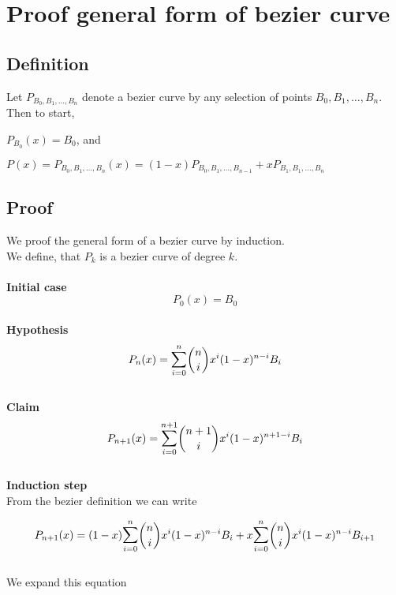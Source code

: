 \section{Proof general form of bezier curve}
\label{sec:proofgeneralformofbeziercurve}

\subsection{Definition}
Let $P_{B_0,B_1,\ldots,B_n}$ denote a bezier curve by any selection of points $B_0,B_1,\ldots,B_n$.
Then to start,

$P_{B_0}(x)=B_0$, and

$P(x)=P_{B_0,B_1,\ldots,B_n}(x)=(1-x)P_{B_0,B_1,\ldots,B_{n-1}}+xP_{B_1,B_1,\ldots,B_n}$

\subsection{Proof}
We proof the general form of a bezier curve by induction.
\\
We define, that $P_k$ is a bezier curve of degree $k$.
\\
\\
\textbf{Initial case}
\\
\begin{equation*}
    P_0(x)=B_0
\end{equation*}
\\
\textbf{Hypothesis}
\\
\begin{equation*}
    P_n(x)=\mathlarger{\sum}_{i = 0}^{n} {n \choose i}x^i (1-x)^{n-i} B_i
\end{equation*}
\\
\textbf{Claim}
\\
\begin{equation*}
    P_{n+1}(x)=\mathlarger{\sum}_{i = 0}^{n+1} {n+1 \choose i}x^i (1-x)^{n+1-i} B_i
\end{equation*}
\\
\textbf{Induction step}
\\
From the bezier definition we can write

\begin{equation*}
    P_{n+1}(x)=(1-x)\mathlarger{\sum}_{i = 0}^{n} {n \choose i}x^i (1-x)^{n-i}B_i + x\mathlarger{\sum}_{i = 0}^{n} {n \choose i}x^i (1-x)^{n-i}B_{i+1}
\end{equation*}
\\
We expand this equation

